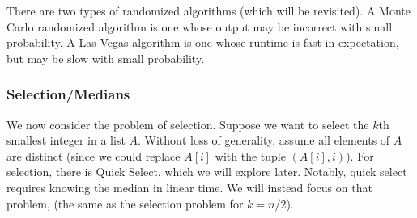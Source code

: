 There are two types of randomized algorithms (which will be revisited). A Monte Carlo randomized algorithm is one whose
output may be incorrect with small probability. A Las Vegas algorithm is one whose runtime is fast in expectation, but may be slow
with small probability.

\subsubsection{Selection/Medians}

We now consider the problem of selection. Suppose we want to select the $k$th smallest integer in a list $A$. Without loss of generality,
assume all elements of $A$ are distinct (since we could replace $A[i]$ with the tuple $(A[i], i)$). For selection, there is Quick Select, which
we will explore later. Notably, quick select requires knowing the median in linear time. We will instead focus on that problem,
(the same as the selection problem for $k = n/2$).

